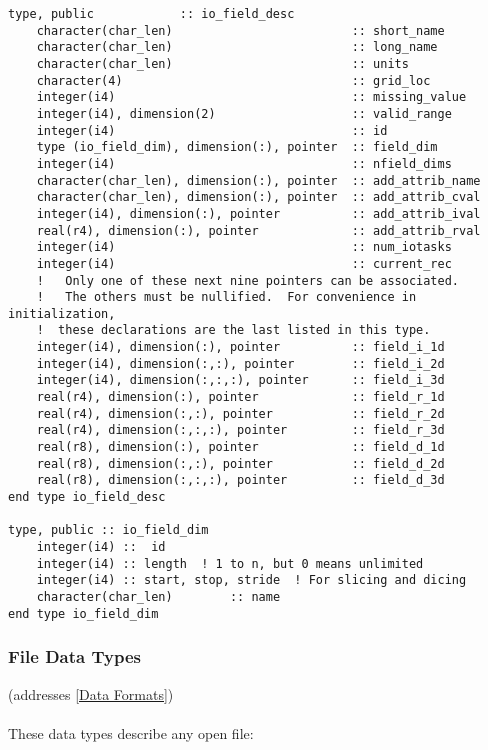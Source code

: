 \documentclass[11pt]{article}
\begin{document}
\begin{verbatim}
type, public            :: io_field_desc
    character(char_len)                         :: short_name
    character(char_len)                         :: long_name
    character(char_len)                         :: units
    character(4)                                :: grid_loc
    integer(i4)                                 :: missing_value
    integer(i4), dimension(2)                   :: valid_range
    integer(i4)                                 :: id
    type (io_field_dim), dimension(:), pointer  :: field_dim
    integer(i4)                                 :: nfield_dims
    character(char_len), dimension(:), pointer  :: add_attrib_name
    character(char_len), dimension(:), pointer  :: add_attrib_cval
    integer(i4), dimension(:), pointer          :: add_attrib_ival
    real(r4), dimension(:), pointer             :: add_attrib_rval
    integer(i4)                                 :: num_iotasks
    integer(i4)                                 :: current_rec
    !   Only one of these next nine pointers can be associated.
    !   The others must be nullified.  For convenience in initialization,
    !  these declarations are the last listed in this type.
    integer(i4), dimension(:), pointer          :: field_i_1d
    integer(i4), dimension(:,:), pointer        :: field_i_2d
    integer(i4), dimension(:,:,:), pointer      :: field_i_3d
    real(r4), dimension(:), pointer             :: field_r_1d
    real(r4), dimension(:,:), pointer           :: field_r_2d
    real(r4), dimension(:,:,:), pointer         :: field_r_3d
    real(r8), dimension(:), pointer             :: field_d_1d
    real(r8), dimension(:,:), pointer           :: field_d_2d
    real(r8), dimension(:,:,:), pointer         :: field_d_3d
end type io_field_desc

type, public :: io_field_dim
    integer(i4) ::  id
    integer(i4) :: length  ! 1 to n, but 0 means unlimited
    integer(i4) :: start, stop, stride  ! For slicing and dicing
    character(char_len)        :: name
end type io_field_dim
\end{verbatim}

\subsubsection{File Data Types}
(addresses \ref{Data Formats})
\paragraph{}
These data types describe any open file:
\end{document}
